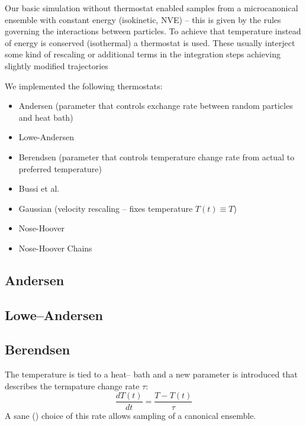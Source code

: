

Our basic simulation without thermostat enabled samples from a microcanonical ensemble with constant energy (isokinetic, NVE) -- this is given by the rules governing the interactions between particles.
To achieve that temperature instead of energy is conserved (isothermal) a thermostat is used. These usually interject some kind of rescaling or additional terms in the integration steps achieving slightly modified trajectories

We implemented the following thermostats: %
\begin{itemize}
\item Andersen (parameter that controls exchange rate between random particles and heat bath)
\item Lowe-Andersen
\item Berendsen (parameter that controls temperature change rate from actual to preferred temperature)
\item Bussi et al.
\item Gaussian (velocity rescaling -- fixes temperature $T(t) \equiv T$)
\item Nose-Hoover
\item Nose-Hoover Chains
\end{itemize}

\subsection{Andersen}
\subsection{Lowe--Andersen}
\subsection{Berendsen}
The temperature is tied to a heat-- bath and a new parameter is introduced that describes the termpature change rate $\tau$:
\begin{equation*}
\frac{dT(t)}{dt} = \frac{T-T(t)}{\tau} %
\end{equation*}
A sane (\TODO) choice of this rate allows sampling of a canonical ensemble.

